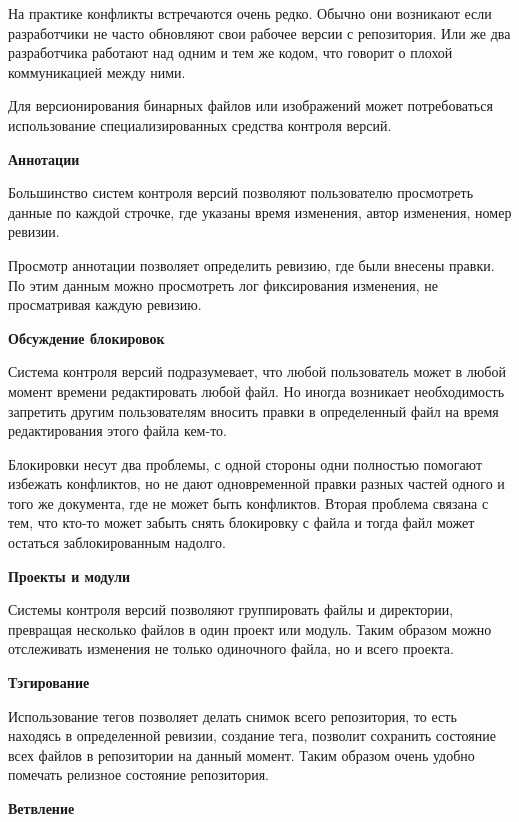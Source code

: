 На практике конфликты встречаются очень редко. Обычно они возникают если разработчики не часто обновляют свои рабочее версии с репозитория. Или же два разработчика работают над одним и тем же кодом, что говорит о плохой коммуникацией между ними.

Для версионирования бинарных файлов или изображений может потребоваться использование специализированных средства контроля версий.

\textbf{ Аннотации }%

Большинство систем контроля версий позволяют пользователю просмотреть данные по каждой строчке, где указаны время изменения, автор изменения, номер ревизии.


Просмотр аннотации позволяет определить ревизию, где были внесены правки. По этим данным можно просмотреть лог фиксирования изменения, не просматривая каждую ревизию.

\textbf{ Обсуждение блокировок } %

Система контроля версий подразумевает, что любой пользователь может в любой момент времени редактировать любой файл. Но иногда возникает необходимость запретить другим пользователям вносить правки в определенный файл на время редактирования этого файла кем-то.

Блокировки несут два проблемы, с одной стороны одни полностью помогают избежать конфликтов, но не дают одновременной правки разных частей одного и того же документа, где не может быть конфликтов. Вторая проблема связана с тем, что кто-то может забыть снять блокировку с файла и тогда файл может остаться заблокированным надолго.


\textbf{ Проекты и модули }%

Системы контроля версий позволяют группировать файлы и директории, превращая несколько файлов в один проект или модуль. Таким образом можно отслеживать изменения не только одиночного файла, но и всего проекта.

 \textbf{ Тэгирование }%
 
 Использование тегов позволяет делать снимок всего репозитория, то есть находясь в определенной ревизии, создание тега, позволит сохранить состояние всех файлов в репозитории на данный момент. Таким образом очень удобно помечать релизное состояние репозитория.
 
  \textbf{ Ветвление } %
  
